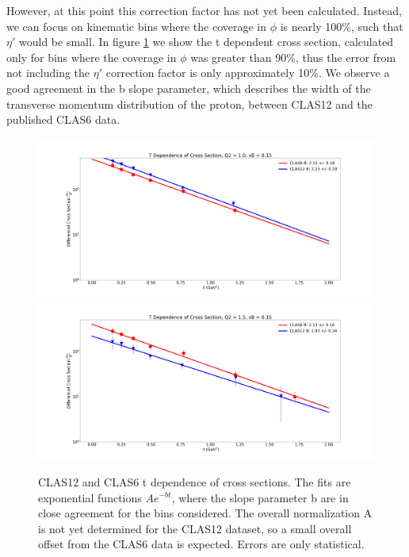     However, at this point this correction factor has not yet been calculated. Instead, we can focus on kinematic bins where the coverage in $\phi$ is nearly 100\%, such that $\eta'$ would be small. In figure \ref{fig:tdep} we show the t dependent cross section, calculated only for bins where the coverage in $\phi$ was greater than 90\%, thus the error from not including the $\eta'$ correction factor is only approximately 10\%. We observe a good agreement in the b slope parameter, which describes the width of the transverse momentum distribution of the proton, between CLAS12 and the published CLAS6 data.
    
    
    \begin{figure}[hbt]
    	\centering
    	\includegraphics[page=125,width=0.45\linewidth]{Chapters/Ch5-Further/t_dependence/pics/fig_1.0_0.15.png}
    	\includegraphics[page=130,width=0.45\linewidth]{Chapters/Ch5-Further/t_dependence/pics/fig_1.5_0.15.png}
    
    	\caption[t dependence]{CLAS12 and CLAS6 t dependence of cross sections. The fits are exponential functions $Ae^{-bt}$, where the slope parameter b are in close agreement for the bins considered. The overall normalization A is not yet determined for the CLAS12 dataset, so a small overall offset from the CLAS6 data is expected. Errors are only statistical.}
    	\label{fig:tdep}
    \end{figure}
    
